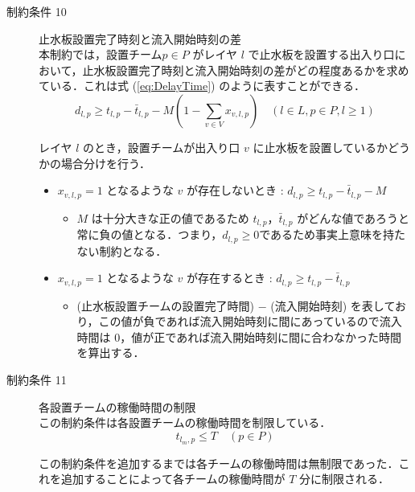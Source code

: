 \documentclass[a4paper,12pt,fleqn]{jarticle}
\begin{document}
\begin{description}
\item [制約条件 10] 止水板設置完了時刻と流入開始時刻の差\\
  本制約では，設置チーム$p \in P$ がレイヤ $l$ で止水板を設置する出入り口において，止水板設置完了時刻と流入開始時刻の差がどの程度あるかを求めている．これは式 (\ref{eq:DelayTime}) のように表すことができる．
  \begin{equation}
    d_{l,p}\geq t_{l,p}-\bar{t}_{l,p}-M(1- \sum_{v \in V}x_{v,l,p})
    \quad (l \in L,p \in P,l \geq 1)\label{eq:DelayTime}
  \end{equation}

  レイヤ $l$ のとき，設置チームが出入り口 $v$ に止水板を設置しているかどうかの場合分けを行う．

  \begin{itemize}
  \item $x_{v,l,p} = 1$ となるような $v$ が存在しないとき : $d_{l,p} \geq t_{l,p} - \bar{t}_{l,p} - M$
    \begin{itemize}
    \item $M$ は十分大きな正の値であるため $t_{l,p}$，$\bar{t}_{l,p}$ がどんな値であろうと常に負の値となる．つまり，$d_{l,p} \geq 0$であるため事実上意味を持たない制約となる．
    \end{itemize}

  \item $x_{v,l,p} = 1$ となるような $v$ が存在するとき : $d_{l,p} \geq t_{l,p} - \bar{t}_{l,p}$
    \begin{itemize}
    \item (止水板設置チームの設置完了時間) $-$ (流入開始時刻) を表しており，この値が負であれば流入開始時刻に間にあっているので流入時間は $0$，値が正であれば流入開始時刻に間に合わなかった時間を算出する．
    \end{itemize}
  \end{itemize}

\item [制約条件 11] 各設置チームの稼働時間の制限\\
  この制約条件は各設置チームの稼働時間を制限している．
    \begin{equation}
      t_{l_{m},p} \leq T \quad (p \in P)
      \label{eq:Timelimit}
    \end{equation}

    この制約条件を追加するまでは各チームの稼働時間は無制限であった．これを追加することによって各チームの稼働時間が $T$ 分に制限される．
  \end{description}
\end{document}
